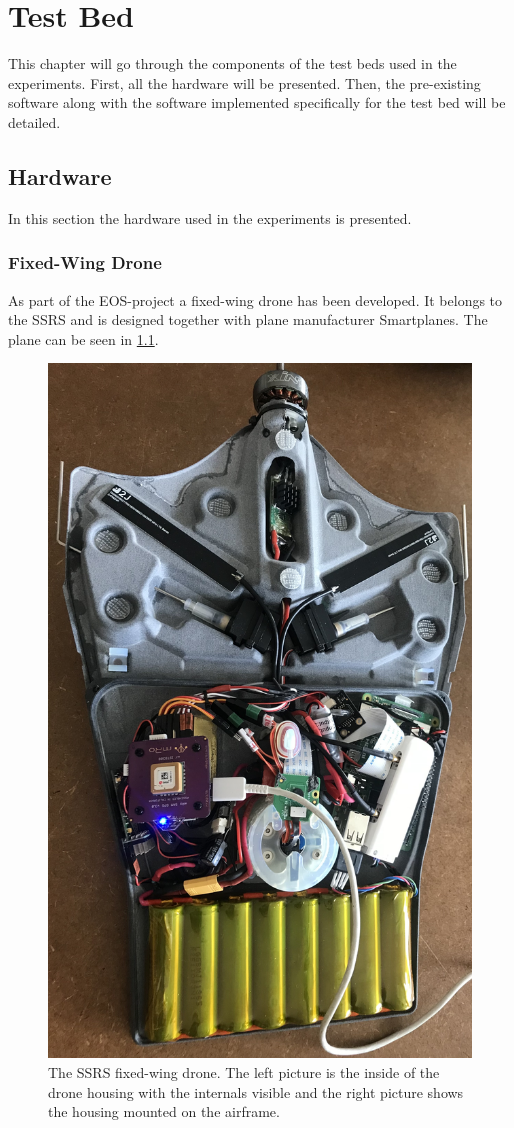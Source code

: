 \documentclass[nofilelist]{cslthse-msc}
\begin{document}
\chapter{Test Bed}
This chapter will go through the components of the test beds used in the experiments. First, all the hardware will be presented. Then, the pre-existing software along with the software implemented specifically for the test bed will be detailed.

\section{Hardware}
In this section the hardware used in the experiments is presented. 

\subsection{Fixed-Wing Drone}
As part of the EOS-project a fixed-wing drone has been developed. It belongs to the SSRS and is designed together with plane manufacturer Smartplanes. The plane can be seen in \ref{fig:fv-drone-pics}.

\begin{figure}[htp]
   \centering
   \includegraphics[width=.25\textwidth]{images/fv-1.jpg}
   \caption{The SSRS fixed-wing drone. The left picture is the inside of the drone housing with the internals visible and the right picture shows the housing mounted on the airframe.}
   \label{fig:fv-drone-pics}
\end{figure}
\end{document}
